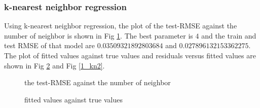 \documentclass{article}
\begin{document}
\subsubsection{k-nearest neighbor regression}

Using k-nearest neighbor regression, the plot of the test-RMSE against the number of neighbor is shown in Fig \ref{1_kn}. The best parameter is $4$ and the train and test RMSE of that model are $0.03509321892803684$ and $0.027896132153362275$. The plot of fitted values against true values and residuals versus fitted values are shown in Fig \ref{1_kn1} and Fig \ref{1_kn2}.


\begin{figure}[!htbp]
\centering
{}
\caption{the test-RMSE against the number of neighbor} \label{1_kn}
\end{figure}

\begin{figure}[!htbp]
\centering
{}
\caption{fitted values against true values} \label{1_kn1}
\end{figure}
\end{document}
